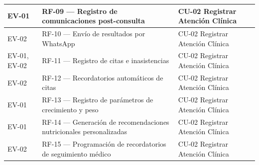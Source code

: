 \documentclass[
]{article}
\newcounter{none} %
\begin{document}
{\def\LTcaptype{none} %
\begin{longtable}[]{@{}
  >{\raggedright\arraybackslash}p{}
  >{\raggedright\arraybackslash}p{}
  >{\raggedright\arraybackslash}p{}@{}}
\toprule\noalign{}
\begin{minipage}[b]{\linewidth}\raggedright
EV-01
\end{minipage} & \begin{minipage}[b]{\linewidth}\raggedright
RF-09 --- Registro de comunicaciones post-consulta
\end{minipage} & \begin{minipage}[b]{\linewidth}\raggedright
CU-02 Registrar Atención Clínica
\end{minipage} \\
\midrule\noalign{}
\endhead
\bottomrule\noalign{}
\endlastfoot
EV-02 & \begin{minipage}[t]{\linewidth}\raggedright
RF-10 --- Envío de resultados por WhatsApp
\end{minipage} & CU-02 Registrar Atención Clínica \\
EV-01, EV-02 & \begin{minipage}[t]{\linewidth}\raggedright
RF-11 --- Registro de citas e inasistencias
\end{minipage} & CU-02 Registrar Atención Clínica \\
EV-02 & \begin{minipage}[t]{\linewidth}\raggedright
RF-12 --- Recordatorios automáticos de citas
\end{minipage} & CU-02 Registrar Atención Clínica \\
EV-01 & \begin{minipage}[t]{\linewidth}\raggedright
RF-13 --- Registro de parámetros de crecimiento y peso
\end{minipage} & CU-02 Registrar Atención Clínica \\
EV-01 & \begin{minipage}[t]{\linewidth}\raggedright
RF-14 --- Generación de recomendaciones nutricionales personalizadas
\end{minipage} & CU-02 Registrar Atención Clínica \\
EV-02 & \begin{minipage}[t]{\linewidth}\raggedright
RF-15 --- Programación de recordatorios de seguimiento médico
\end{minipage} & CU-02 Registrar Atención Clínica \\

\end{longtable}}
\end{document}
